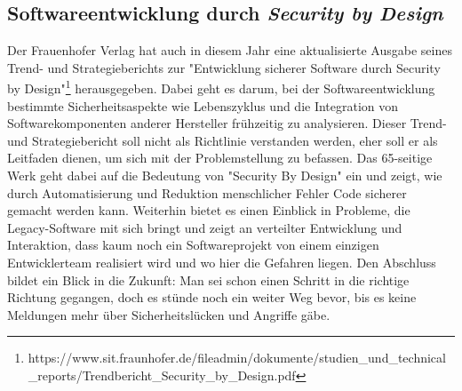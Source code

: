 \subsection{Softwareentwicklung durch \textit{Security by Design}}
Der Frauenhofer Verlag hat auch in diesem Jahr eine aktualisierte 
Ausgabe seines Trend- und Strategieberichts zur "Entwicklung sicherer 
Software durch Security by Design"\footnote{https://www.sit.fraunhofer.de/fileadmin/dokumente/studien_und_technical_reports/Trendbericht_Security_by_Design.pdf} 
herausgegeben.
Dabei geht es darum, bei der Softwareentwicklung bestimmte
Sicherheitsaspekte wie Lebenszyklus und die Integration von 
Softwarekomponenten anderer Hersteller frühzeitig zu analysieren.
Dieser Trend- und Strategiebericht soll nicht als Richtlinie verstanden
werden, eher soll er als Leitfaden dienen, um sich mit der Problemstellung
zu befassen.
Das 65-seitige Werk geht dabei auf die Bedeutung von "Security By Design" ein
und zeigt, wie durch Automatisierung und Reduktion menschlicher Fehler
Code sicherer gemacht werden kann. Weiterhin bietet es einen Einblick
in Probleme, die Legacy-Software mit sich bringt und zeigt an verteilter 
Entwicklung und Interaktion, dass kaum noch ein Softwareprojekt von einem
einzigen Entwicklerteam realisiert wird und wo hier die Gefahren liegen.
Den Abschluss bildet ein Blick in die Zukunft: Man sei schon einen Schritt in die richtige Richtung gegangen, doch es  
stünde noch ein weiter Weg bevor, bis es keine Meldungen mehr 
über Sicherheitslücken und Angriffe gäbe.
